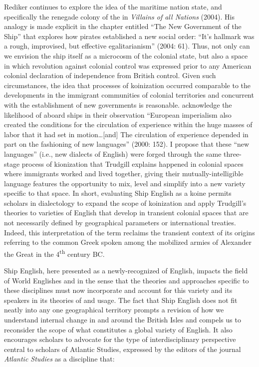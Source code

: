 Rediker continues to explore the idea of the maritime nation state, and specifically the renegade colony of the  in \textit{Villains of all Nations} (2004). His analogy is made explicit in the chapter entitled “The New Government of the Ship” that explores how pirates established a new social order: “It’s hallmark was a rough, improvised, but effective egalitarianism” (2004: 61). Thus, not only can we envision the ship itself as a microcosm of the colonial state, but also a space in which revolution against colonial control was expressed prior to any American colonial declaration of independence from British control. Given such circumstances, the idea that processes of koinization occurred comparable to the developments in the immigrant communities of colonial territories and concurrent with the establishment of new governments is reasonable. \citeauthor{LinebaughRediker2000} acknowledge the likelihood of  aboard ships in their observation “European imperialism also created the conditions for the circulation of experience within the huge masses of labor that it had set in motion…[and] The circulation of experience depended in part on the fashioning of new languages” (2000: 152). I propose that these “new languages” (i.e., new dialects of English) were forged through the same three-stage process of kionization that Trudgill explains happened in colonial spaces where immigrants worked and lived together, giving their mutually-intelligible language features the opportunity to mix, level and simplify into a new variety specific to that space. In short, evaluating Ship English as a koine permits scholars in dialectology to expand the scope of koinization and apply Trudgill’s theories to varieties of English that develop in transient colonial spaces that are not necessarily defined by geographical parameters or international treaties. Indeed, this interpretation of the term reclaims the transient context of its origins referring to the common Greek  spoken among the mobilized armies of Alexander the Great in the 4\textsuperscript{th} century BC. 

Ship English, here presented as a newly-recognized  of English, impacts the field of World Englishes and  in the sense that the theories and approaches specific to these disciplines must now incorporate and account for this variety and its speakers in its theories of  and usage. The fact that Ship English does not fit neatly into any one geographical territory prompts a revision of how we understand internal  change in and around the British Isles and compels us to reconsider the scope of what constitutes a global variety of English. It also encourages scholars to advocate for the type of interdisciplinary perspective central to scholars of Atlantic Studies, expressed by the editors of the journal \textit{Atlantic Studies} as a discipline that:

